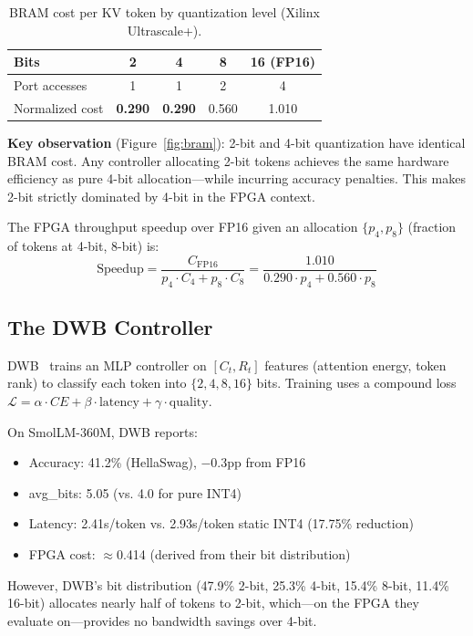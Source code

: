 \documentclass{article}
\begin{document}
\begin{table}[h]
\centering
\caption{BRAM cost per KV token by quantization level (Xilinx Ultrascale+).}
\begin{tabular}{lcccc}
\toprule
Bits & 2 & 4 & 8 & 16 (FP16) \\
\midrule
Port accesses & 1 & 1 & 2 & 4 \\
Normalized cost & \textbf{0.290} & \textbf{0.290} & 0.560 & 1.010 \\
\bottomrule
\end{tabular}
\label{tab:bram}
\end{table}

\textbf{Key observation} (Figure~\ref{fig:bram}): 2-bit and 4-bit quantization have identical BRAM cost. Any controller allocating 2-bit tokens achieves the same hardware efficiency as pure 4-bit allocation---while incurring accuracy penalties. This makes 2-bit strictly dominated by 4-bit in the FPGA context.

The FPGA throughput speedup over FP16 given an allocation $\{p_4, p_8\}$ (fraction of tokens at 4-bit, 8-bit) is:
\[
\text{Speedup} = \frac{C_\text{FP16}}{p_4 \cdot C_4 + p_8 \cdot C_8} = \frac{1.010}{0.290 \cdot p_4 + 0.560 \cdot p_8}
\]

\subsection{The DWB Controller}

DWB~\citep{haeri2026dwb} trains an MLP controller on $[C_t, R_t]$ features (attention energy, token rank) to classify each token into $\{2, 4, 8, 16\}$ bits. Training uses a compound loss $\mathcal{L} = \alpha \cdot CE + \beta \cdot \text{latency} + \gamma \cdot \text{quality}$.

On SmolLM-360M, DWB reports:
\begin{itemize}
\item Accuracy: 41.2\% (HellaSwag), $-$0.3pp from FP16
\item avg\_bits: 5.05 (vs. 4.0 for pure INT4)
\item Latency: 2.41s/token vs. 2.93s/token static INT4 (17.75\% reduction)
\item FPGA cost: $\approx$0.414 (derived from their bit distribution)
\end{itemize}

However, DWB's bit distribution (47.9\% 2-bit, 25.3\% 4-bit, 15.4\% 8-bit, 11.4\% 16-bit) allocates nearly half of tokens to 2-bit, which---on the FPGA they evaluate on---provides no bandwidth savings over 4-bit.
\end{document}

